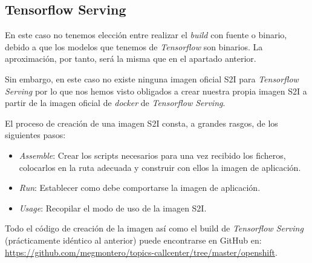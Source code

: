 \subsection{Tensorflow Serving}

En este caso no tenemos elección entre realizar el \textit{build} con fuente o binario, debido a que los modelos que tenemos de \textit{Tensorflow} son binarios. La aproximación, por tanto, será la misma que en el apartado anterior. 

Sin embargo, en este caso no existe ninguna imagen oficial S2I para \textit{Tensorflow Serving} por lo que nos hemos visto obligados a crear nuestra propia imagen S2I a partir de la imagen oficial de \textit{docker} de \textit{Tensorflow Serving}.

El proceso de creación de una imagen S2I consta, a grandes rasgos, de los siguientes pasos: 

\begin{itemize}
\item \textit{Assemble}: Crear los scripts necesarios para una vez recibido los ficheros, colocarlos en la ruta adecuada y construir con ellos la imagen de aplicación. 
\item \textit{Run}: Establecer como debe comportarse la imagen de aplicación.
\item \textit{Usage}: Recopilar el modo de uso de la imagen S2I. 

\end{itemize}

Todo el código de creación de la imagen así como el build de \textit{Tensorflow Serving} (prácticamente idéntico al anterior) puede encontrarse en GitHub en: \href{https://github.com/megmontero/topics-callcenter/tree/master/openshift}{https://github.com/megmontero/topics-callcenter/tree/master/openshift}.



